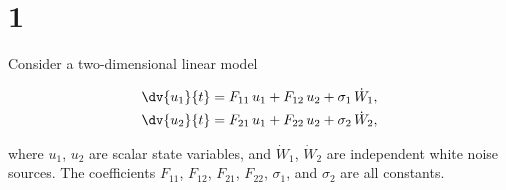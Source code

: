 \section{1}

Consider a two-dimensional linear model

\begin{subequations}
	\begin{align}
		\dv{u_1}{t} &= F_{11}\,u_1 + F_{12}\,u_2 + \sigma_1\,\dot{W}_1, \\
		\dv{u_2}{t} &= F_{21}\,u_1 + F_{22}\,u_2 + \sigma_2\,\dot{W}_2, 
	\end{align}
\end{subequations}

where $u_1$, $u_2$ are scalar state variables, and $\dot{W}_1$, $\dot{W}_2$ are independent white noise sources. The coefficients $F_{11}$, $F_{12}$, $F_{21}$, $F_{22}$, $\sigma_1$, and $\sigma_2$ are all constants.

